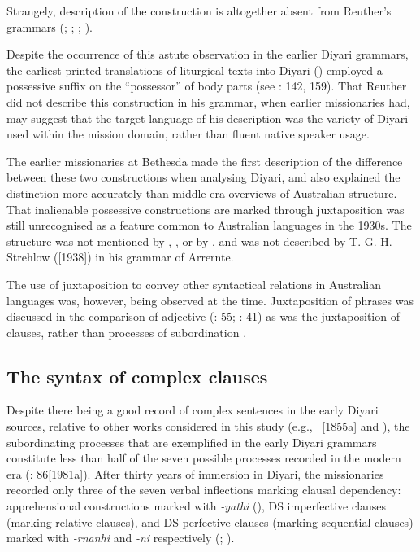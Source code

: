 Strangely, description of the construction is altogether absent from Reuther’s grammars (\citeyear{reuther_dieri_1894}; \citeyear{reuther_reuther_1899}; \citeyear{reuther_ms_1901a}; \citeyear{reuther_ms_1901b}).

Despite the occurrence of this astute observation in the earlier Diyari grammars, the earliest printed translations of liturgical texts into Diyari (\citealt{koch_nujanujarajinkiniexa_1870}) employed a possessive suffix on the “possessor” of body parts (see \citealt{kneebone_teichelmann_2005}: 142, 159). That Reuther did not describe this construction in his grammar, when earlier missionaries had, may suggest that the target language of his description was the variety of Diyari used within the mission domain, rather than fluent native speaker usage.

The earlier missionaries at Bethesda made the first description of the difference between these two constructions when analysing Diyari, and also explained the distinction more accurately than middle-era overviews of Australian structure. That inalienable possessive constructions are marked through juxtaposition was still unrecognised as a feature common to Australian languages in the 1930s. The structure was not mentioned by \citet{elkin_nature_1937}, \citet{capell_structure_1937}, or by \citet{ray_aboriginal_1925}, and was not described by T. G. H. Strehlow (\citeyear{strehlow_aranda_1944}[1938]) in his grammar of Arrernte.

The use of juxtaposition to convey other syntactical relations in Australian languages was, however, being observed at the time. Juxtaposition of phrases was discussed in the comparison of adjective (\citealt{capell_structure_1937}: 55; \citet{elkin_nature_1937}: 41) as was the juxtaposition of clauses, rather than processes of subordination \citep[40]{elkin_nature_1937}.

\subsection{The syntax of complex clauses}
\label{sec:key:8.7.3}\label{bkm:Ref73520500}
Despite there being a good record of complex sentences in the early Diyari sour\-ces, relative to other works considered in this study (e.g., \citealt{ridley_kamilaroi_1875}~[1855a] and \citealt{schurmann_letter_1844}), the subordinating processes that are exemplified in the early Diyari grammars constitute less than half of the seven possible processes recorded in the modern era (\citealt{austin_grammar_2013}: 86[1981a]). After thirty years of immersion in Diyari, the missionaries recorded only three of the seven verbal inflections marking clausal dependency: apprehensional constructions marked with \textit{{}-yathi} (), DS imperfective clauses (marking relative clauses), and DS perfective clauses (marking sequential clauses) marked with \textit{-rnanhi} and \textit{-ni} respectively (; ).

